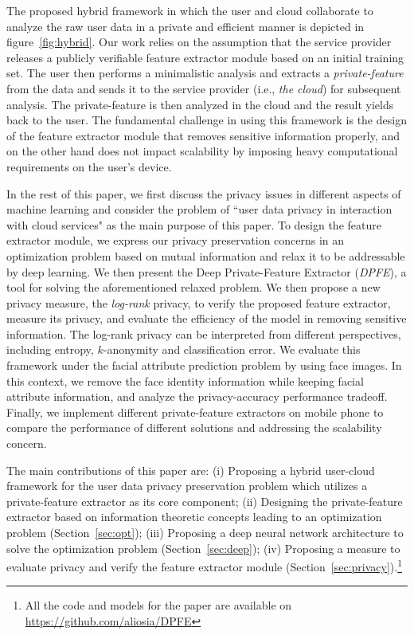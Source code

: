 \documentclass[10pt,journal,compsoc]{IEEEtran}
\begin{document}
The proposed hybrid framework in which the user and cloud collaborate to analyze the raw user data in a private and efficient manner is depicted in figure~\ref{fig:hybrid}. Our work relies on the assumption that the service provider releases a publicly verifiable feature extractor module based on an initial training set. The user then performs a minimalistic analysis and extracts a \emph{private-feature} from the data and sends it to the service provider (i.e., \emph{the cloud}) for subsequent analysis. The private-feature is then analyzed in the cloud and the result yields back to the user. The fundamental challenge in using this framework is the design of the feature extractor module that removes sensitive information properly, and on the other hand does not impact scalability by imposing heavy computational requirements on the user's device.


In the rest of this paper, we first discuss the privacy issues in different aspects of machine learning and consider the problem of ``user data privacy in interaction with cloud services" as the main purpose of this paper. To design the feature extractor module, we express our privacy preservation concerns in an optimization problem based on mutual information and relax it to be addressable by deep learning. We then present the Deep Private-Feature Extractor (\emph{DPFE}), a tool for solving the aforementioned relaxed problem. We then propose a new privacy measure, the \emph{log-rank} privacy, to verify the proposed feature extractor, measure its privacy, and evaluate the efficiency of the model in removing sensitive information. The log-rank privacy can be interpreted from different perspectives, including entropy, $k$-anonymity and classification error. We evaluate this framework under the facial attribute prediction problem by using face images. In this context, we remove the face identity information while keeping facial attribute information, and analyze the privacy-accuracy performance tradeoff. Finally, we implement different private-feature extractors on mobile phone to compare the performance of different solutions and addressing the scalability concern. 


The main contributions of this paper are: (i) Proposing a hybrid user-cloud framework for the user data privacy preservation problem which utilizes a private-feature extractor as its core component; (ii) Designing the private-feature extractor based on information theoretic concepts leading to an optimization problem (Section~\ref{sec:opt}); (iii)  Proposing a deep neural network architecture to solve the optimization problem (Section~\ref{sec:deep}); (iv) Proposing a measure to evaluate privacy and verify the feature extractor module (Section~\ref{sec:privacy}).\footnote{All the code and models for the paper are available on \url{https://github.com/aliosia/DPFE}}
\end{document}
